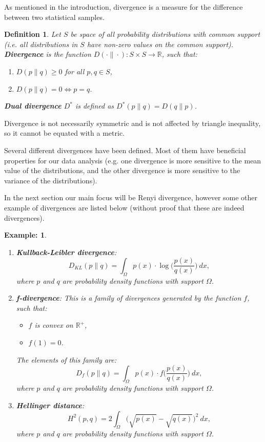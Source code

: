 \documentclass[a4paper, 12pt]{article}
\newtheorem*{example}{Example: }
\newtheorem{definition}{Definition}[section]
\theoremstyle{definition}
\begin{document}
As mentioned in the introduction, divergence is a measure for the difference between two statistical samples.

\begin{definition}
	Let $S$ be space of all probability distributions with common support (i.e. all distributions in $S$ have non-zero values on the common support). \textbf{Divergence} is the function $D(\cdot \| \cdot): S \times S \rightarrow \mathbb{R}$, such that:
	\begin{enumerate}
		\item $D(p \| q) \geq 0$ for all $p, q \in S$,
		\item $D(p \| q) = 0 \Leftrightarrow p = q$.
	\end{enumerate}
	\textbf{Dual divergence} $D^\ast$ is defined as $D^\ast(p \| q) = D(q \| p)$.
\end{definition}

Divergence is not necessarily symmetric and is not affected by triangle inequality, so it cannot be equated with a metric.

\pagebreak

Several different divergences have been defined. Most of them have beneficial properties for our data analysis (e.g. one divergence is more sensitive to the mean value of the distributions, and the other divergence is more sensitive to the variance of the distributions).

In the next section our main focus will be Renyi divergence, however some other example of divergences are listed below (without proof that these are indeed divergences).

\begin{example}
	\leavevmode
	\begin{enumerate}
		\item \textbf{Kullback-Leibler divergence}:
		\begin{equation}
			D_{KL}(p \| q) = \int_\Omega p(x) \cdot \log\Big(\frac{p(x)}{q(x)}\Big) \  dx,
		\end{equation}
		where $p$ and $q$ are probability density functions with support $\Omega$.
		\item \textbf{f-divergence}:
        This is a family of divergences generated by the function $f$, such that:
        \begin{itemize}
			\item $f$ is convex on $\mathbb{R}^+$,
			\item $f(1) = 0$.
		\end{itemize}
		The elements of this family are:
		\begin{equation}
			D_f(p \| q) = \int_\Omega p(x) \cdot f\Big(\frac{p(x)}{q(x)}\Big) \  dx,
		\end{equation}
		where $p$ and $q$ are probability density functions with support $\Omega$.
		\item \textbf{Hellinger distance}:
		\begin{equation}
			H^2(p, q) = 2 \int_\Omega \Big(\sqrt{p(x)} - \sqrt{q(x)}\Big)^2 \  dx,
		\end{equation}
		where $p$ and $q$ are probability density functions with support $\Omega$.
	\end{enumerate}
\end{example}
\end{document}
